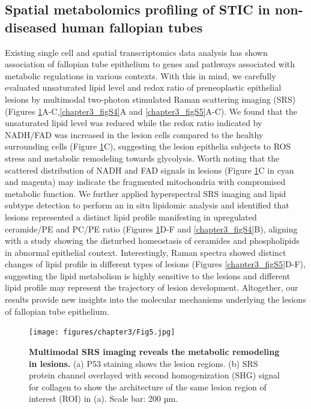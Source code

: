 \begin{refsection}
    
    \subsection{Spatial metabolomics profiling of STIC in non-diseased human fallopian tubes}
    Existing single cell and spatial transcriptomics data analysis has shown association of fallopian tube epithelium to genes and pathways associated with metabolic regulations in various contexts\cite{Dinh2021Single,Ulrich2022Cellular,Weigert2025cell}. With this in mind, we carefully evaluated unsaturated lipid level and redox ratio of preneoplastic epithelial lesions by multimodal two-photon stimulated Raman scattering imaging (SRS) (Figures \ref{chapter3_fig5}A-C,\ref{chapter3_figS4}A and \ref{chapter3_figS5}A-C). We found that the unsaturated lipid level was reduced while the redox ratio indicated by NADH/FAD was increased in the lesion cells compared to the healthy surrounding cells (Figure \ref{chapter3_fig5}C), suggesting the lesion epithelia subjects to ROS stress and metabolic remodeling towards glycolysis\cite{Alhallak2016Optical}. Worth noting that the scattered distribution of NADH and FAD signals in lesions (Figure \ref{chapter3_fig5}C in cyan and magenta) may indicate the fragmented mitochondria with compromised metabolic function.  We further applied hyperspectral SRS imaging and lipid subtype detection\cite{Zhang2024Multi} to perform an in situ lipidomic analysis and identified that lesions represented a distinct lipid profile manifesting in upregulated ceramide/PE and PC/PE ratio (Figures \ref{chapter3_fig5}D-F and \ref{chapter3_figS4}B), aligning with a study showing the disturbed homeostasis of ceramides and phospholipids in abnormal epithelial context\cite{Gao2013Aberrant}. 
    Interestingly, Raman spectra showed distinct changes of lipid profile in different types of lesions (Figures \ref{chapter3_figS5}D-F), suggesting the lipid metabolism is highly sensitive to the lesions and different lipid profile may represent the trajectory of lesion development. Altogether, our results provide new insights into the molecular mechanisms underlying the lesions of fallopian tube epithelium.


    \begin{figure}[p]
        \begin{center}
            \texttt{[image: figures/chapter3/Fig5.jpg]}
            \captionsetup{font=small}
            \caption{ \textbf{Multimodal SRS imaging reveals the metabolic remodeling in lesions.} (a) P53 staining shows the lesion regions. (b) SRS protein channel overlayed with second homogenization (SHG) signal for collagen to show the architecture of the same lesion region of interest (ROI) in (a). Scale bar: 200 µm.}
            \label{chapter3_fig5}
        \end{center}
    \end{figure}
    

\end{refsection}
